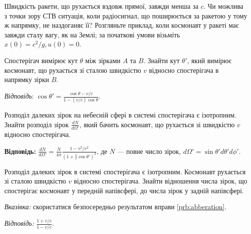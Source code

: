 \begin{problem}
Швидкість ракети, що рухається вздовж прямої, завжди менша за $c$. Чи можлива з точки зору СТВ ситуація, коли радіосигнал, що поширюється за ракетою у тому ж напрямку, не наздоганяє її? Розгляньте приклад, коли космонавт у ракеті має завжди сталу вагу, як на Землі; за початкові умови візьміть $x(0)=c^2/g, u(0)=0$.
\end{problem}

\begin{problem}\label{prb:abberation}
Спостерігач вимірює кут $\theta$ між зірками $A$ та $B$. Знайти кут $\theta'$, який вимірює космонавт, що рухається зі сталою швидкістю $v$ відносно спостерігача в напрямку зірки $B$.

\emph{Відповідь}: $\cos\theta' = \frac{\cos\theta - v/c}{1 - (v/c)\cos\theta}$.
\end{problem}

\begin{problem}
Розподіл далеких зірок на небесній сфері в системі спостерігача є ізотропним. Знайти розподіл зірок $\frac{dN}{d\Omega'}$, який бачить космонавт, що рухається зі швидкістю $v$ відносно спостерігача.

\textbf{Відповідь:} $\frac{dN}{d\Omega'} = \frac{N}{4\pi} \frac{1-v^2/c^2}{(1 + \frac{v}{c}\cos\theta')^2}$, де $N$ — повне число зірок, $d\Omega' = \sin\theta' d\theta' d\phi'$.
\end{problem}

\begin{problem}
Розподіл далеких зірок в системі спостерігача є ізотропним. Космонавт рухається зі сталою швидкістю $v$ відносно спостерігача. Знайти відношення числа зірок, що спостерігає космонавт у передній напівсфері, до числа зірок у задній напівсфері.

\emph{Вказівка:} скористатися безпосередньо результатом вправи \ref{prb:abberation}.

\emph{Відповідь:} $\frac{1+v/c}{1-v/c}$.

\end{problem}

